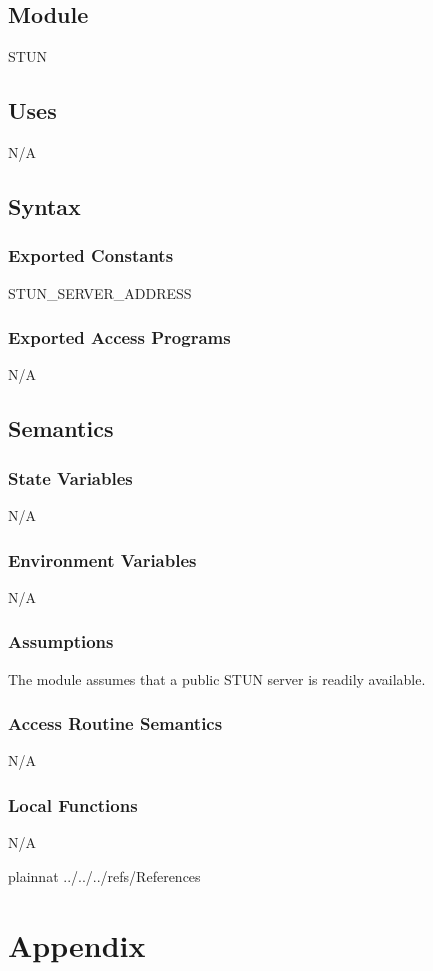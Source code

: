 \documentclass[12pt, titlepage]{article}
\begin{document}
\subsection{Module}
STUN

\subsection{Uses}
N/A

\subsection{Syntax}

\subsubsection{Exported Constants}
STUN\_SERVER\_ADDRESS

\subsubsection{Exported Access Programs}
N/A

\subsection{Semantics}

\subsubsection{State Variables}
N/A

\subsubsection{Environment Variables}
N/A

\subsubsection{Assumptions}
The module assumes that a public STUN server is readily available.

\subsubsection{Access Routine Semantics}
N/A

\subsubsection{Local Functions}
N/A

\newpage

 {plainnat}
 {../../../refs/References}

\newpage

\section{Appendix} \label{Appendix}

\end{document}
